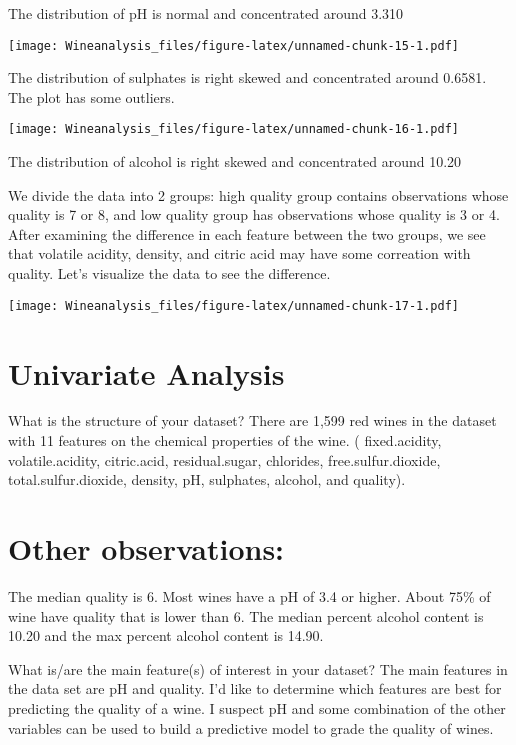 \documentclass[]{article}
\begin{document}
The distribution of pH is normal and concentrated around 3.310

\texttt{[image: Wineanalysis\_files/figure-latex/unnamed-chunk-15-1.pdf]}

The distribution of sulphates is right skewed and concentrated around
0.6581. The plot has some outliers.

\texttt{[image: Wineanalysis\_files/figure-latex/unnamed-chunk-16-1.pdf]}

The distribution of alcohol is right skewed and concentrated around
10.20

We divide the data into 2 groups: high quality group contains
observations whose quality is 7 or 8, and low quality group has
observations whose quality is 3 or 4. After examining the difference in
each feature between the two groups, we see that volatile acidity,
density, and citric acid may have some correation with quality. Let's
visualize the data to see the difference.

\texttt{[image: Wineanalysis\_files/figure-latex/unnamed-chunk-17-1.pdf]}

\section{Univariate Analysis}\label{univariate-analysis}

What is the structure of your dataset? There are 1,599 red wines in the
dataset with 11 features on the chemical properties of the wine. (
fixed.acidity, volatile.acidity, citric.acid, residual.sugar, chlorides,
free.sulfur.dioxide, total.sulfur.dioxide, density, pH, sulphates,
alcohol, and quality).

\section{Other observations:}\label{other-observations}

The median quality is 6. Most wines have a pH of 3.4 or higher. About
75\% of wine have quality that is lower than 6. The median percent
alcohol content is 10.20 and the max percent alcohol content is 14.90.

What is/are the main feature(s) of interest in your dataset? The main
features in the data set are pH and quality. I'd like to determine which
features are best for predicting the quality of a wine. I suspect pH and
some combination of the other variables can be used to build a
predictive model to grade the quality of wines.
\end{document}
